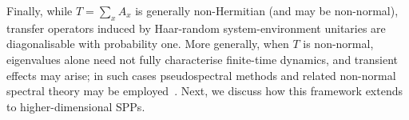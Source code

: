 Finally, while \(T=\sum_x A_x\) is generally non-Hermitian (and may be non-normal), transfer operators induced by Haar-random system-environment unitaries are diagonalisable with probability one. More generally, when \(T\) is non-normal, eigenvalues alone need not fully characterise finite-time dynamics, and transient effects may arise; in such cases pseudospectral methods and related non-normal spectral theory may be employed~\cite{trefethenSpectraPseudospectraBehavior2005}. Next, we discuss how this framework extends to higher-dimensional SPPs.





